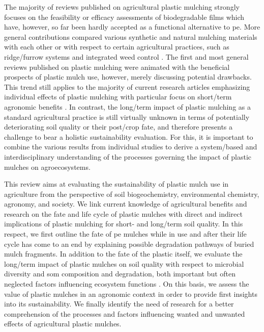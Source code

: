 The majority of reviews published on agricultural plastic mulching strongly focuses on the feasibility or efficacy assessments of biodegradable films \citep{BrodhagenBiodegradable2015,KasirajanPolyethylene2012} which have, however, so far been hardly accepted as a functional alternative to \ac{pe}. More general contributions compared various synthetic and natural mulching materials with each other \citep{Chalker-ScottImpact2007,GreerAluminum2003} or with respect to certain agricultural practices, such as ridge\-/furrow systems \citep{GanRidgeFurrow2013} and integrated weed control \citep{BondNonchemical2001,CaseReview2005}. The first and most general reviews published on plastic mulching \citep{LamontPlastic1993,TararaMicroclimate2000} were animated with the beneficial prospects of plastic mulch use, however, merely discussing potential drawbacks. This trend still applies to the majority of current research articles emphasizing individual effects of plastic mulching with particular focus on short\-/term agronomic benefits \citep[for instance][]{HeRice2013,Lopez-LopezWater2015,WangCombination2010}. In contrast, the long\-/term impact of plastic mulching as a standard agricultural practice is still virtually unknown in terms of potentially deteriorating soil quality or their post\-/crop fate, and therefore presents a challenge to bear a holistic sustainability evaluation. For this, it is important to combine the various results from individual studies to derive a system\-/based and interdisciplinary understanding of the processes governing the impact of plastic mulches on agroecosystems.

This review aims at evaluating the sustainability of plastic mulch use in agriculture from the perspective of soil biogeochemistry, environmental chemistry, agronomy, and society. We link current knowledge of agricultural benefits and research on the fate and life cycle of plastic mulches with direct and indirect implications of plastic mulching for short- and long\-/term soil quality. In this respect, we first outline the fate of \ac{pe} mulches while in use and after their life cycle has come to an end by explaining possible degradation pathways of buried mulch fragments. In addition to the fate of the plastic itself, we evaluate the long\-/term impact of plastic mulches on soil quality with respect to microbial diversity and \ac{som} composition and degradation, both important but often neglected factors influencing ecosystem functions \citep{PowerEcosystem2010}. On this basis, we assess the value of plastic mulches in an agronomic context in order to provide first insights into its sustainability. We finally identify the need of research for a better comprehension of the processes and factors influencing wanted and unwanted effects of agricultural plastic mulches.

